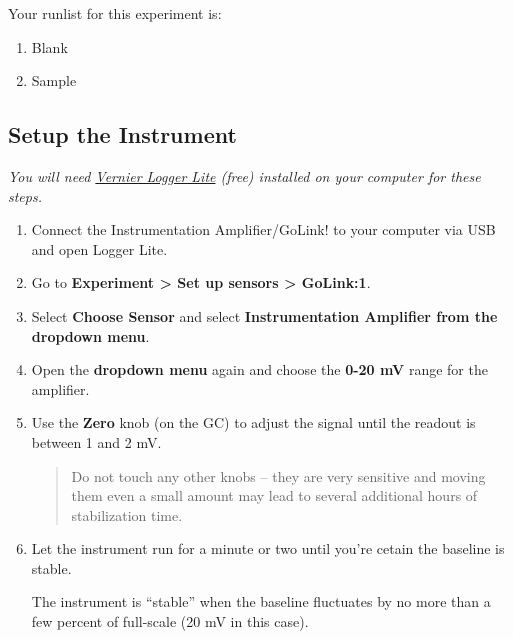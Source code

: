 \documentclass[]{tufte-book}
\providecommand{\tightlist}{%
  \setlength{\itemsep}{0pt}\setlength{\parskip}{0pt}}
\begin{document}
Your runlist for this experiment is:

\begin{enumerate}
\def\labelenumi{\arabic{enumi}.}
\tightlist
\item
  Blank
\item
  Sample
\end{enumerate}

\hypertarget{setup-the-instrument}{%
\subsection{Setup the Instrument}\label{setup-the-instrument}}

\emph{You will need \href{https://www.vernier.com/products/software/logger-lite/\#section5}{Vernier Logger Lite} (free) installed on your computer for these steps.}

\begin{enumerate}
\def\labelenumi{\arabic{enumi}.}
\item
  Connect the Instrumentation Amplifier/GoLink! to your computer via USB and open Logger Lite.\\
\item
  Go to \textbf{Experiment \textgreater{} Set up sensors \textgreater{} GoLink:1}.\\
\item
  Select \textbf{Choose Sensor} and select \textbf{Instrumentation Amplifier from the dropdown menu}.\\
\item
  Open the \textbf{dropdown menu} again and choose the \textbf{0-20 mV} range for the amplifier.
\item
  Use the \textbf{Zero} knob (on the GC) to adjust the signal until the readout is between 1 and 2 mV.

  \begin{quote}
  Do not touch any other knobs -- they are very sensitive and moving them even a small amount may lead to several additional hours of stabilization time.
  \end{quote}
\item
  Let the instrument run for a minute or two until you're cetain the baseline is stable.

  \begin{marginfigure}
   The instrument is ``stable'' when the baseline fluctuates by no more
   than a few percent of full-scale (20 mV in this case).
   \end{marginfigure}
\end{enumerate}
\end{document}
